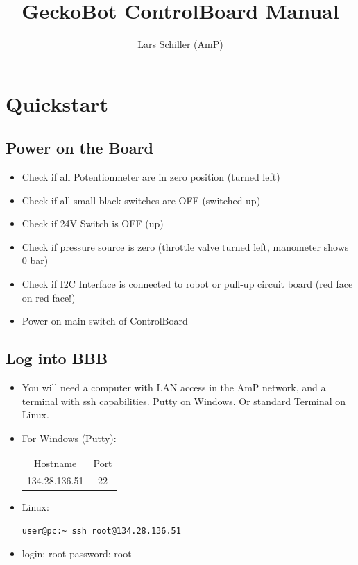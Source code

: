 \documentclass[
	fontsize=10pt
	paper=a4
]{scrartcl}
\author{Lars Schiller (AmP)}
\title{GeckoBot ControlBoard Manual}
\begin{document}
\maketitle
\tableofcontents


\clearpage
\section{Quickstart}

\subsection{Power on the Board}

\begin{itemize}
\item Check if all Potentionmeter are in zero position (turned left)
\item Check if all small black switches are OFF (switched up)
\item Check if 24V Switch is OFF (up)
\item Check if pressure source is zero (throttle valve turned left, manometer shows 0 bar)
\item Check if I2C Interface is connected to robot or pull-up circuit board (red face on red face!)
\item Power on main switch of ControlBoard



\end{itemize}

\subsection{Log into BBB}

\begin{itemize}

\item 	You will need a computer with LAN access in the AmP network, and a terminal with ssh capabilities. Putty on Windows. Or standard Terminal on Linux.

\item For Windows (Putty):
\begin{tabular}{cc}
Hostname & Port \\
134.28.136.51 & 22 \\
\end{tabular}

\item Linux:
\begin{lstlisting}
user@pc:~ ssh root@134.28.136.51
\end{lstlisting}

\item login: root \qquad password: root

\end{itemize}
\end{document}
